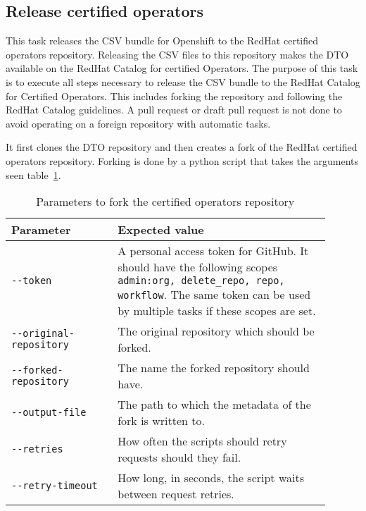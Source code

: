 \subsection{Release certified operators}\label{subsec:release-certified-operators}

This task releases the CSV bundle for Openshift to the RedHat certified operators repository.
Releasing the CSV files to this repository makes the DTO available on the RedHat Catalog for certified Operators.
The purpose of this task is to execute all steps necessary to release the CSV bundle to the RedHat Catalog for Certified Operators.
This includes forking the repository and following the RedHat Catalog guidelines.
A pull request or draft pull request is not done to avoid operating on a foreign repository with automatic tasks.

It first clones the DTO repository and then creates a fork of the RedHat certified operators repository.
Forking is done by a python script that takes the arguments seen table\ \ref{tab:parameters-to-fork-the-certified-operators-repository}.

\begin{table}[H]
    \centering
    \caption{Parameters to fork the certified operators repository}
    \label{tab:parameters-to-fork-the-certified-operators-repository}
    \begin{tabular}{|p{0.3\linewidth}|p{0.6\linewidth}}
        Parameter & Expected value \\
        \hline
        \verb|--token| & A personal access token for GitHub.
            It should have the following scopes \verb|admin:org, delete_repo, repo, workflow|.
            The same token can be used by multiple tasks if these scopes are set. \\
        \verb|--original-repository| & The original repository which should be forked. \\
        \verb|--forked-repository| & The name the forked repository should have. \\
        \verb|--output-file| & The path to which the metadata of the fork is written to. \\
        \verb|--retries| & How often the scripts should retry requests should they fail. \\
        \verb|--retry-timeout| & How long, in seconds, the script waits between request retries. \\
    \end{tabular}
\end{table}

